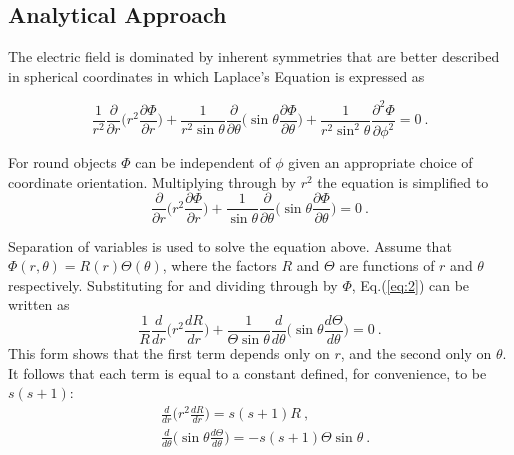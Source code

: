 \documentclass[a4paper]{jpconf}
\begin{document}
\subsection*{Analytical Approach} 

The electric field is dominated by inherent symmetries that are better described in spherical coordinates \cite{RHB-MathematicalMethods} in which Laplace's Equation is expressed as

\begin{equation}
\frac{1}{r^2}\frac{\partial}{\partial r}\bigg(r^2 \frac{\partial \Phi}{\partial r}\bigg) + \frac{1}{r^2 \sin \theta} \frac{\partial}{\partial \theta}\bigg(\sin \theta \frac{\partial \Phi}{\partial \theta}\bigg) + \frac{1}{r^2 \sin^2 \theta}\frac{\partial^2 \Phi}{\partial \phi^2} = 0~.
\label{eq:1}
\end{equation}

For round objects $\Phi$ can be independent of $\phi$ given an appropriate choice of coordinate orientation. Multiplying through by $r^2$ the equation is simplified to
\begin{equation}
\frac{\partial}{\partial r}\bigg(r^2 \frac{\partial \Phi}{\partial r}\bigg) + \frac{1}{\sin \theta}\frac{\partial}{\partial \theta}\bigg(\sin \theta \frac{\partial \Phi}{\partial \theta}\bigg) = 0~.
\label{eq:2}
\end{equation}

Separation of variables is used to solve the equation above. Assume that $\Phi(r,\theta) = R(r)\Theta(\theta)$, where the factors $R$ and $\Theta$ are functions of $r$ and $\theta$ respectively. Substituting for and dividing through by $\Phi$, Eq.(\ref{eq:2}) can be written as 
\begin{equation}
\frac{1}{R}\frac{d}{dr}\bigg(r^2 \frac{dR}{dr}\bigg) + \frac{1}{\Theta \sin \theta}\frac{d}{d \theta}\bigg(\sin \theta \frac{d \Theta }{d \theta}\bigg) = 0~.
\label{eq:3}
\end{equation}This form shows that the first term depends only on $r$, and the second only on $\theta$. It follows that  each term is equal to a constant defined, for convenience, to be $s(s+1)$:
\begin{subequations}
\begin{align}
&\frac{d}{dr}\bigg(r^2 \frac{dR}{dr}\bigg) = s (s+1) R~, \label{eq:4.1}\\ 
&\frac{d}{d \theta}\bigg(\sin \theta \frac{d \Theta}{d \theta}\bigg) = - s (s+1) \Theta \sin \theta~. \label{eq:4.2}
\end{align}
\label{eq:4}
\end{subequations} 
\end{document}
